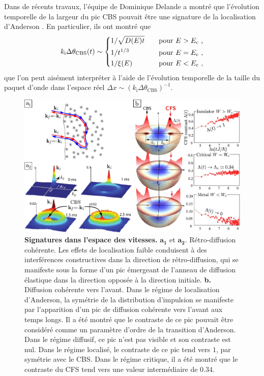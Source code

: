 Dans de récents travaux, l'équipe de Dominique Delande a montré que l'évolution temporelle de la largeur du pic CBS pouvait être une signature de la localisation d'Anderson \citep{ghosh2015coherent}. En particulier, ils ont montré que 
\begin{equation}
k_{\mathrm{i}} \Delta\theta_{\mathrm{CBS}}(t) \sim \left\lbrace \begin{aligned}
& 1/\sqrt{D(E)t}  \quad &&\text{pour } E>E_{\mathrm{c}} \text{ ,}\\
& 1/t^{1/3} \quad &&\text{pour } E=E_{\mathrm{c}} \text{ ,}\\
& 1/\xi(E) \quad &&\text{pour } E<E_{\mathrm{c}} \text{ ,}
\end{aligned}\right.
\label{eq:largeur_cbs}
\end{equation}
que l'on peut aisément interpréter à l'aide de l'évolution temporelle de la taille du paquet d'onde dans l'espace réel $\Delta x\sim (k_{\mathrm{i}} \Delta \theta_{\mathrm{CBS}})^{-1}$.

\begin{figure}
\centering
\includegraphics[width=\textwidth]{Fig/Conclusion/cbs_cfs.pdf}
\caption{\textbf{Signatures dans l'espace des vitesses.} $\mathbf{a_1}$ et $\mathbf{a_2.}$ Rétro-diffusion cohérente. Les effets de localisation faible conduisent à des interférences constructives dans la direction de rétro-diffusion, qui se manifeste sous la forme d'un pic émergeant de l'anneau de diffusion élastique dans la direction opposée à la direction initiale. \textbf{b.} Diffusion cohérente vers l'avant. Dans le régime de localisation d'Anderson, la symétrie de la distribution d'impulsion se manifeste par l'apparition d'un pic de diffusion cohérente vers l'avant aux temps longs. Il a été montré que le contraste de ce pic pouvait être considéré comme un paramètre d'ordre de la transition d'Anderson. Dans le régime diffusif, ce pic n'est pas visible et son contraste est nul. Dans le régime localisé, le contraste de ce pic tend vers $1$, par symétrie avec le CBS. Dans le régime critique, il a été montré que le contraste du CFS tend vers une valeur intermédiaire de $0.34$. }
\label{fig:cbs_cfs}
\end{figure}

